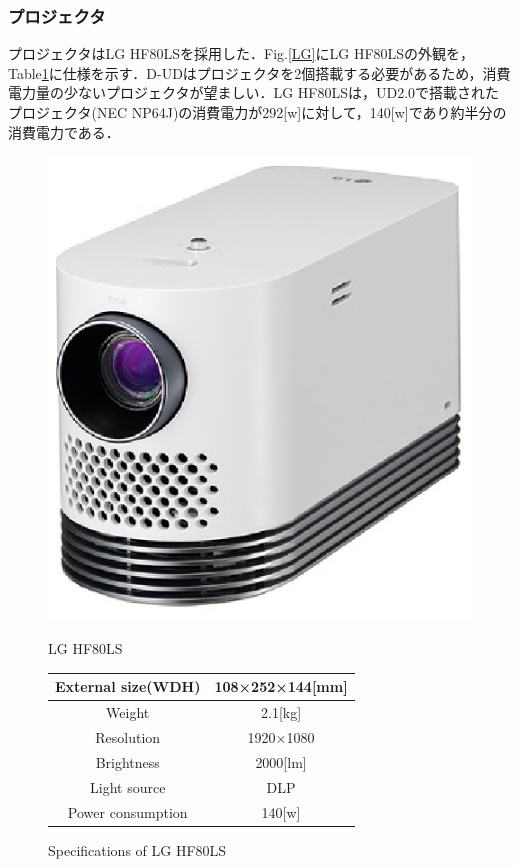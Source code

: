 \documentclass[12pt]{sonota/aislab}
\begin{document}
\subsubsection{プロジェクタ}
プロジェクタはLG HF80LSを採用した．Fig.\ref{LG}にLG HF80LSの外観を，Table\ref{table:LG}に仕様を示す．D-UDはプロジェクタを2個搭載する必要があるため，消費電力量の少ないプロジェクタが望ましい．LG HF80LSは，UD2.0で搭載されたプロジェクタ(NEC NP64J)の消費電力が292[w]に対して，140[w]であり約半分の消費電力である．

\begin{figure}
\begin{minipage}{0.4\textwidth}
\begin{center}
\includegraphics[scale=0.5]{figs/lg_projector.eps}
\caption{LG HF80LS}
\label{LG}
\end{center}
\end{minipage}
\begin{minipage}{0.5\textwidth}
\begin{center}
\makeatletter
\def\@captype{table}
\makeatother
\caption{Specifications of LG HF80LS}
	\begin{tabular}[tbp]{|c|c|}
		\hline 
		External size(WDH) & 108×252×144[mm] \\\hline
		Weight & 2.1[kg] \\\hline
		Resolution & 1920×1080 \\\hline
		Brightness & 2000[lm] \\\hline
		Light source & DLP \\\hline
		Power consumption & 140[w] \\\hline
	\end{tabular}
\label{table:LG}
\end{center}
\end{minipage}
\end{figure}
\end{document}

